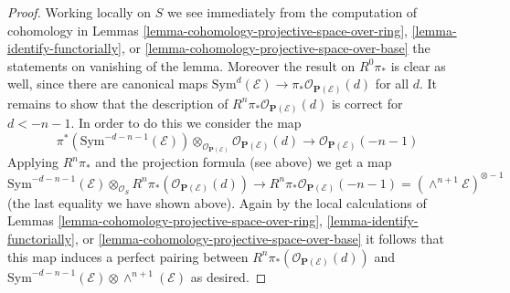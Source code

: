 \documentclass[10pt,a4paper]{amsart}
\theoremstyle{plain}
\theoremstyle{definition}
\theoremstyle{remark}
\numberwithin{equation}{subsection}
\begin{document}
\begin{proof}
\medskip\noindent
Working locally on $S$ we see immediately from the computation of
cohomology in Lemmas \ref{lemma-cohomology-projective-space-over-ring},
\ref{lemma-identify-functorially}, or
\ref{lemma-cohomology-projective-space-over-base} the statements on
vanishing of the lemma. Moreover the result on $R^0\pi_*$ is clear
as well, since there are canonical maps
$\text{Sym}^d(\mathcal{E}) \to \pi_* \mathcal{O}_{\mathbf{P}(\mathcal{E})}(d)$
for all $d$. It remains to show that the description of
$R^n\pi_*\mathcal{O}_{\mathbf{P}(\mathcal{E})}(d)$ is correct
for $d < -n - 1$. In order to do this we consider the map
$$
\pi^*(\text{Sym}^{-d - n - 1}(\mathcal{E}))
\otimes_{\mathcal{O}_{\mathbf{P}(\mathcal{E})}}
\mathcal{O}_{\mathbf{P}(\mathcal{E})}(d)
\longrightarrow
\mathcal{O}_{\mathbf{P}(\mathcal{E})}(-n - 1)
$$
Applying $R^n\pi_*$ and the projection formula (see above) we get a map
$$
\text{Sym}^{-d - n - 1}(\mathcal{E})
\otimes_{\mathcal{O}_S}
R^n\pi_*(\mathcal{O}_{\mathbf{P}(\mathcal{E})}(d))
\longrightarrow
R^n\pi_*\mathcal{O}_{\mathbf{P}(\mathcal{E})}(-n - 1) =
(\wedge^{n + 1}\mathcal{E})^{\otimes -1}
$$
(the last equality we have shown above).
Again by the local calculations of Lemmas
\ref{lemma-cohomology-projective-space-over-ring},
\ref{lemma-identify-functorially}, or
\ref{lemma-cohomology-projective-space-over-base}
it follows that this map induces a perfect pairing between
$R^n\pi_*(\mathcal{O}_{\mathbf{P}(\mathcal{E})}(d))$ and
$\text{Sym}^{-d - n - 1}(\mathcal{E}) \otimes \wedge^{n + 1}(\mathcal{E})$
as desired.
\end{proof}
\end{document}
